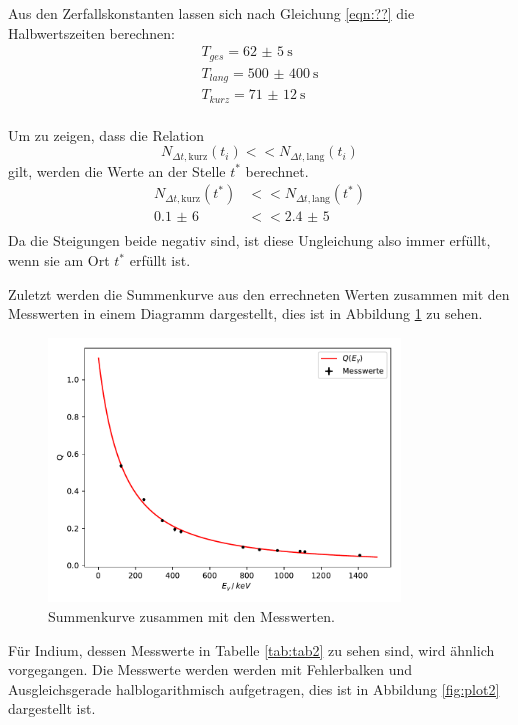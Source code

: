 Aus den Zerfallskonstanten lassen sich nach Gleichung \ref{eqn:??} die Halbwertszeiten berechnen:
\begin{align*}
  T_{ges}=\SI{62(5)}{\s}\\
  T_{lang}=\SI{500(400)}{\s}\\
  T_{kurz}=\SI{71(12)}{\s}\\
\end{align*}

Um zu zeigen, dass die Relation
\begin{equation}
  N_{\Delta t,\text{kurz}}(t_i) <<N_{\Delta t,\text{lang}}(t_i)
\end{equation}
gilt, werden die Werte an der Stelle $t^{*}$ berechnet.
\begin{align}
  N_{\Delta t,\text{kurz}}(t^{*}) &<<N_{\Delta t,\text{lang}}(t^{*})\\
  \SI{0,1(6)}{}&<<\SI{2,4(5)}{}\\
\end{align}
Da die Steigungen beide negativ sind, ist diese Ungleichung also immer erfüllt, wenn sie
am Ort $t^{*}$ erfüllt ist.

Zuletzt werden die Summenkurve aus den errechneten Werten zusammen mit den Messwerten in
einem Diagramm dargestellt, dies ist in Abbildung \ref{fig:plot4} zu sehen.
\begin{figure}[H]
  \centering
  \includegraphics[height=7cm]{plot4.pdf}
  \caption{Summenkurve zusammen mit den Messwerten.}
  \label{fig:plot4}
\end{figure}

Für Indium, dessen Messwerte in Tabelle \ref{tab:tab2} zu sehen sind, wird ähnlich vorgegangen.
Die Messwerte werden werden mit Fehlerbalken und Ausgleichsgerade halblogarithmisch
aufgetragen, dies ist in Abbildung \ref{fig:plot2} dargestellt ist.


